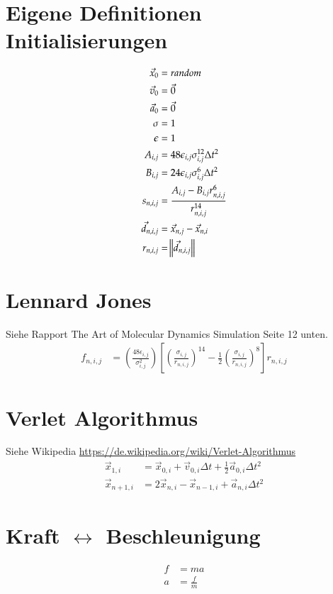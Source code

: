 \documentclass{article}
\begin{document}
\section*{Eigene Definitionen Initialisierungen}
\begin{align}
\vec{x}_0&=random\\
	\vec{v}_0&=\vec{0}\\
	\vec{a}_0&=\vec{0}\\
	\sigma&=1\\
	\epsilon&=1\\
	A_{i,j}&=48\epsilon_{i,j}\sigma_{i,j}^{12}\Delta t^2\\
	B_{i,j}&=24\epsilon_{i,j}\sigma_{i,j}^{6}\Delta t^2\\
	s_{n,i,j}&=\frac{A_{i,j}-B_{i,j}r_{n,i,j}^6}{r_{n,i,j}^{14}}\\
	\vec{d}_{n,i,j}&=\vec{x}_{n,j}-\vec{x}_{n,i}\\
	r_{n,i,j}&=\norm{\vec{d}_{n,i,j}}\\
\end{align}

\section*{Lennard Jones}
Siehe Rapport The Art of Molecular Dynamics Simulation Seite 12 unten.\\
\begin{align*}
	f_{n,i,j}&=\left(\frac{48\epsilon_{i,j}}{\sigma_{i,j}^2}\right)\left[\left(\frac{\sigma_{i,j}}{r_{n,i,j}}\right)^{14}-\frac{1}{2}\left(\frac{\sigma_{i,j}}{r_{n,i,j}}\right)^8\right]r_{n,i,j}
\end{align*}
\section*{Verlet Algorithmus}
Siehe Wikipedia \url{https://de.wikipedia.org/wiki/Verlet-Algorithmus}\\
\begin{align*}
	\vec{x}_{1,i}&=\vec{x}_{0,i}+\vec{v}_{0,i}\Delta t+\frac{1}{2}\vec{a}_{0,i}\Delta t^2\\
	\vec{x}_{n+1,i}&=2\vec{x}_{n,i}-\vec{x}_{n-1,i}+\vec{a}_{n,i}\Delta t^2
\end{align*}
\section*{Kraft $\leftrightarrow$ Beschleunigung}
\begin{align*}
	f&=ma\\
	a&=\frac{f}{m}
\end{align*}
\end{document}
